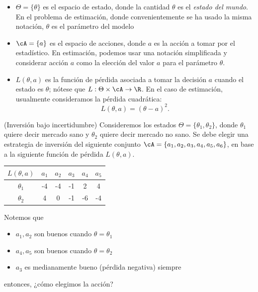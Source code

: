 \begin{itemize}
	\item $\Theta = \{\theta\}$ es el espacio de estado, donde la cantidad $\theta$ es el \textit{estado del mundo}. En el problema de estimación, donde convenientemente se ha usado la misma notación, $\theta$ es el parámetro del modelo
	\item $\cA=\{a\}$ es el espacio de acciones, donde $a$ es la acción a tomar por el estadístico. En estimación, podemos usar una notación simplificada y considerar acción $a$  como la elección del valor $a$ para el parámetro $\theta$. 
	\item $L(\theta,a)$ es la función de pérdida asociada a tomar la decisión $a$ cuando el estado es $\theta$; nótese que $L:\Theta\times\cA\rightarrow\R$. En el caso de estimación, usualmente consideramos la pérdida cuadrática:
	\begin{equation}
		L(\theta,a) = (\theta-a)^2.
	\end{equation}
\end{itemize}

\begin{example}(Inversión bajo incertidumbre)
	Consideremos los estados $\Theta = \{\theta_1,\theta_2\}$, donde $\theta_1$ quiere decir mercado sano y $\theta_2$ quiere decir mercado no sano. Se debe elegir una estrategia de inversión del siguiente conjunto $\cA=\{a_1,a_2,a_3,a_4,a_5,a_6\}$, en base a la siguiente función de pérdida $L(\theta,a)$.
	\begin{table}[ht]
		\centering
		\begin{tabular}{c|c|c|c|c|c}
			$L(\theta,a)$   & $a_1$ & $a_2$ & $a_3$ & $a_4$ & $a_5$ \\
			\hline
			$\theta_1$ & -4   & -4   & -1   & 2    & 4    \\
			$\theta_2$  & 4    & 0    & -1   & -6   & -4
		\end{tabular}
	\end{table} 

	Notemos que \begin{itemize}
		\item $a_1, a_2$ son buenos  cuando $\theta=\theta_1$
		\item $a_4,a_5$ son buenos cuando $\theta=\theta_2$
		\item $a_3$ es medianamente bueno (pérdida negativa) siempre
	\end{itemize}
	entonces, ¿cómo elegimos la acción?
\end{example}

